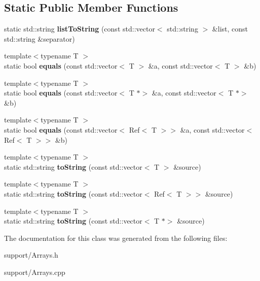 \subsection*{Static Public Member Functions}
\begin{DoxyCompactItemize}
\item 
\mbox{\label{classantlrcpp_1_1Arrays_a26206255ced012b39abd6038a26ebe52}} 
static std\+::string {\bfseries list\+To\+String} (const std\+::vector$<$ std\+::string $>$ \&list, const std\+::string \&separator)
\item 
\mbox{\label{classantlrcpp_1_1Arrays_a4c9ad217a86ea72ff6002d047a52b5b8}} 
{\footnotesize template$<$typename T $>$ }\\static bool {\bfseries equals} (const std\+::vector$<$ T $>$ \&a, const std\+::vector$<$ T $>$ \&b)
\item 
\mbox{\label{classantlrcpp_1_1Arrays_a0a37625104accd974460c3bf0a2fb2e4}} 
{\footnotesize template$<$typename T $>$ }\\static bool {\bfseries equals} (const std\+::vector$<$ T $\ast$$>$ \&a, const std\+::vector$<$ T $\ast$$>$ \&b)
\item 
\mbox{\label{classantlrcpp_1_1Arrays_a741eca4e255c0e2fbe1da6d61142373d}} 
{\footnotesize template$<$typename T $>$ }\\static bool {\bfseries equals} (const std\+::vector$<$ Ref$<$ T $>$$>$ \&a, const std\+::vector$<$ Ref$<$ T $>$$>$ \&b)
\item 
\mbox{\label{classantlrcpp_1_1Arrays_a83ee6616704317f7c4ada54c734bd9d7}} 
{\footnotesize template$<$typename T $>$ }\\static std\+::string {\bfseries to\+String} (const std\+::vector$<$ T $>$ \&source)
\item 
\mbox{\label{classantlrcpp_1_1Arrays_a85f05d02ce37da59147c1506f336c5d8}} 
{\footnotesize template$<$typename T $>$ }\\static std\+::string {\bfseries to\+String} (const std\+::vector$<$ Ref$<$ T $>$$>$ \&source)
\item 
\mbox{\label{classantlrcpp_1_1Arrays_ad1d931e19e30aa99e0044600970c63c4}} 
{\footnotesize template$<$typename T $>$ }\\static std\+::string {\bfseries to\+String} (const std\+::vector$<$ T $\ast$$>$ \&source)
\end{DoxyCompactItemize}


The documentation for this class was generated from the following files\+:\begin{DoxyCompactItemize}
\item 
support/Arrays.\+h\item 
support/Arrays.\+cpp\end{DoxyCompactItemize}

